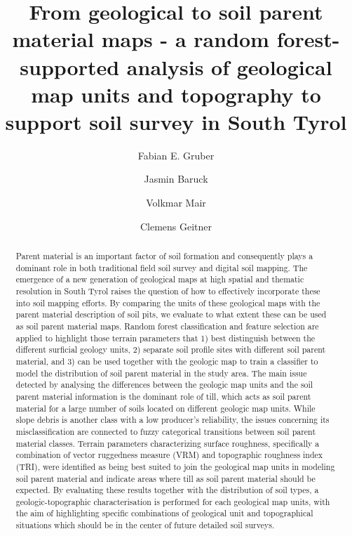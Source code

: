 \documentclass[preprint,12pt,authoryear]{elsarticle}
\begin{document}
\begin{frontmatter}

\title{From geological to soil parent material maps - a random forest-supported  analysis of geological map units and topography to support soil survey in South Tyrol}



\author[mymainadress]{Fabian E. Gruber}
\author[mymainadress]{Jasmin Baruck}
\author[secondadress]{Volkmar Mair}
\author[mymainadress]{Clemens Geitner}



\address[mymainadress]{Institute of Geography, University of Innsbruck, Innrain 52f, 6020 Innsbruck, Austria}
\address[secondadress]{ Amt f\"ur Geologie und Baustoffpr\"ufung, Eggentaler Stra{\ss}e 48, 39053 Kardaun, Autonomous Province Bolzano -- South Tyrol, Italy}
\begin{abstract}
Parent material is an important factor of soil formation and consequently plays a dominant role in both traditional field soil survey and digital soil mapping. The emergence of a new generation of geological maps at high spatial and thematic resolution in South Tyrol raises the question of how to effectively incorporate these into soil mapping efforts. By comparing the units of these geological maps with the parent material description of soil pits, we evaluate to what extent these can be used as soil parent material maps. Random forest classification and feature selection are applied to highlight those terrain parameters that 1) best distinguish between the different surficial geology units, 2) separate soil profile sites with different soil parent material, and 3) can be used together with the geologic map to train a classifier to model the distribution of soil parent material in the study area. The main issue detected by analysing the differences between the geologic map units and the soil parent material information is the dominant role of till, which acts as soil parent material for a large number of soils located on different geologic map units. While slope debris is another class with a low producer's reliability, the issues concerning its misclassification are connected to fuzzy categorical transitions between soil parent material classes.  Terrain parameters characterizing surface roughness, specifically a combination of vector ruggedness measure (VRM) and topographic roughness index (TRI), were identified as being best suited to join the geological map units in modeling soil parent material and indicate areas where till as soil parent material should be expected.
By evaluating these results together with the distribution of soil types, a geologic-topographic characterisation is performed for each geological map units, with the aim of highlighting specific combinations of geological unit and topographical situations which should be in  the center of future detailed soil surveys.
\end{abstract}


\end{frontmatter}
\end{document}
